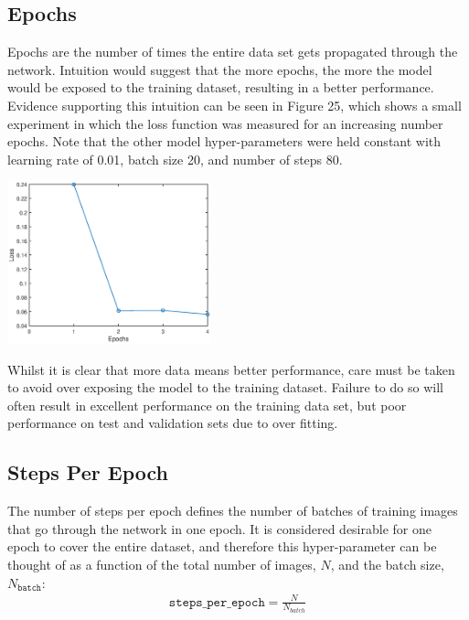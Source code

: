 \documentclass[a4paper]{article}
\begin{document}
\subsection{Epochs}
\begin{minipage}{0.45\textwidth}
Epochs are the number of times the entire data set gets propagated through the network. Intuition would suggest that the more epochs, the more the model would be exposed to the training dataset, resulting in a better performance. Evidence supporting this intuition can be seen in Figure 25, which shows a small experiment in which the loss function was measured for an increasing number epochs. Note that the other model hyper-parameters were held constant with learning rate of 0.01, batch size 20, and number of steps 80.
\end{minipage}
\hspace{1cm}
\begin{minipage}{0.45\textwidth}
\centering
\includegraphics[height=4.7cm]{hyp_par_2}
\end{minipage}

\vspace{0.2cm}

Whilst it is clear that more data means better performance, care must be taken to avoid over exposing the model to the training dataset. Failure to do so will often result in excellent performance on the training data set, but poor performance on test and validation sets due to over fitting.

\subsection{Steps Per Epoch}
The number of steps per epoch defines the number of batches of training images that go through the network in one epoch. It is considered desirable for one epoch to cover the entire dataset, and therefore this hyper-parameter can be thought of as a function of the total number of images, $N$, and the batch size, $N_{\texttt{batch}}$:
\begin{align}
	\texttt{steps\_per\_epoch} = \frac{N}{N_{batch}}
\end{align}
\end{document}
